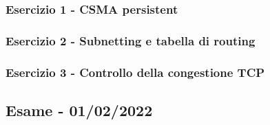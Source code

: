 \documentclass[a4paper]{article}
\begin{document}
	\subsubsection{Esercizio 1 - CSMA persistent}
	
	\subsubsection{Esercizio 2 - Subnetting e tabella di routing}
	
	\subsubsection{Esercizio 3 - Controllo della congestione TCP}
	
	\newpage

	\subsection[\textbf{Esame - 01/02/2022}]{Esame - 01/02/2022}
	
\end{document}
